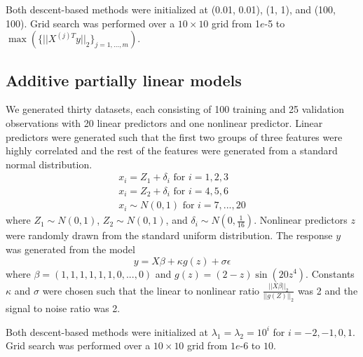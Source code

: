 \documentclass[10pt,letterpaper]{article}
\begin{document}
Both descent-based methods were initialized at (0.01, 0.01), (1, 1), and (100, 100). Grid search was performed over a $10 \times 10$ grid from 1$e$-5 to $\max(\{||X^{(j)T}y ||_2\}_{j=1,..., m})$.

\subsection{Additive partially linear models}\label{sec:simulationAPLM}

We generated thirty datasets, each consisting of 100 training and 25 validation observations with 20 linear predictors and one nonlinear predictor. Linear predictors were generated such that the first two groups of three features were highly correlated and the rest of the features were generated from a standard normal distribution.
\begin{equation}
\begin{array}{c}
x_i = Z_1 + \delta_i \text{ for } i=1, 2, 3 \\
x_i = Z_2 + \delta_i \text{ for } i= 4, 5, 6 \\
x_i \sim N(0,1) \text{ for } i = 7, ..., 20
\end{array}
\end{equation}
where $Z_1 \sim N(0,1)$, $Z_2 \sim N(0,1)$, and $\delta_i \sim N(0, \frac{1}{16})$. Nonlinear predictors $z$ were randomly drawn from the standard uniform distribution. The response $y$ was generated from the model
\begin{equation}
y = X\beta + \kappa g(z) + \sigma \epsilon
\end{equation}
where $\beta = (1, 1, 1, 1, 1, 1, 0, ..., 0)$ and $g(z) =(2-z)\sin(20z^4)$. Constants $\kappa$ and $\sigma$ were chosen such that the linear to nonlinear ratio $\frac{||X\beta||_2}{||g(Z)||_2}$ was 2 and the signal to noise ratio was 2. 

Both descent-based methods were initialized at $\lambda_1 = \lambda_2 = 10^i$ for $i=-2, -1, 0, 1$. Grid search was performed over a $10 \times 10$ grid from $1e\text{-}6$ to $10$.
\end{document}
